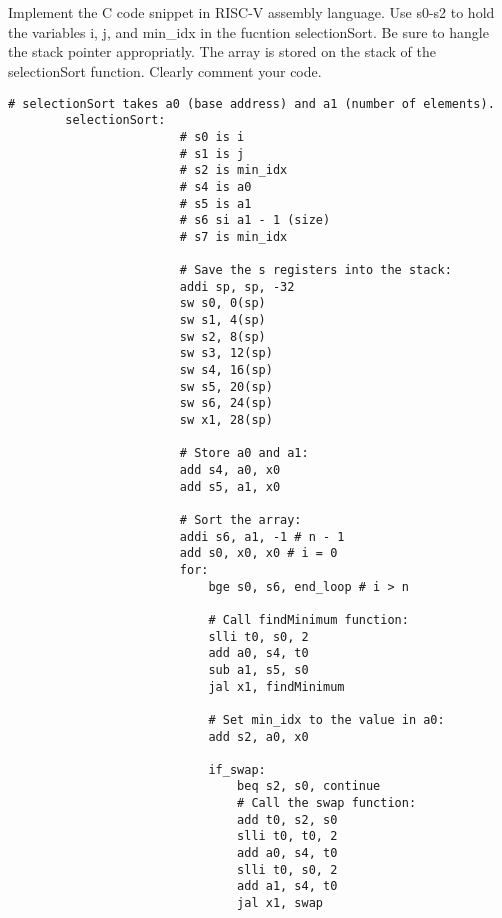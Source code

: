 \documentclass[12pt]{article}
\begin{document}
    \section{}
    \begin{flushleft}
        Implement the C code snippet in RISC-V assembly language. Use s0-s2 to hold the variables
        i, j, and min_idx in the fucntion selectionSort. Be sure to hangle the stack pointer
        appropriatly. The array is stored on the stack of the selectionSort function. Clearly 
        comment your code.
    \end{flushleft}
    \begin{lstlisting}[language=RISCV]
        # selectionSort takes a0 (base address) and a1 (number of elements).
        selectionSort:
                        # s0 is i
                        # s1 is j
                        # s2 is min_idx
                        # s4 is a0
                        # s5 is a1
                        # s6 si a1 - 1 (size)
                        # s7 is min_idx

                        # Save the s registers into the stack:
                        addi sp, sp, -32
                        sw s0, 0(sp)
                        sw s1, 4(sp)
                        sw s2, 8(sp)
                        sw s3, 12(sp)
                        sw s4, 16(sp)
                        sw s5, 20(sp)
                        sw s6, 24(sp)
                        sw x1, 28(sp)

                        # Store a0 and a1:
                        add s4, a0, x0
                        add s5, a1, x0
            
                        # Sort the array:
                        addi s6, a1, -1 # n - 1 
                        add s0, x0, x0 # i = 0
                        for:
                            bge s0, s6, end_loop # i > n

                            # Call findMinimum function:
                            slli t0, s0, 2
                            add a0, s4, t0
                            sub a1, s5, s0
                            jal x1, findMinimum

                            # Set min_idx to the value in a0:
                            add s2, a0, x0

                            if_swap:
                                beq s2, s0, continue
                                # Call the swap function:
                                add t0, s2, s0
                                slli t0, t0, 2
                                add a0, s4, t0
                                slli t0, s0, 2
                                add a1, s4, t0
                                jal x1, swap


\end{lstlisting}
\end{document}
